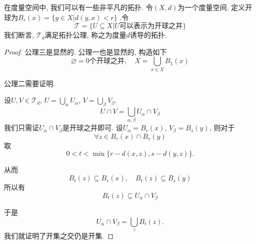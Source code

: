 在度量空间中, 我们可以有一些非平凡的拓扑. 令$\left( X, d \right) $为一个度量空间, 定义开球为$B_{r}\left( x \right)  = \{ y \in X | d\left( y,x \right) < r \}$ .令
\begin{equation}
    \mathscr{T} = \{ U \subseteq X | U \text{可以表示为开球之并} \}
\end{equation}
我们断言, $\mathscr{T}_{d}$满足拓扑公理, 称之为度量$d$诱导的拓扑.
\begin{proof}
    公理三是显然的. 公理一也是显然的, 构造如下
    \begin{equation}
      \varnothing = \text{0个开球之并},\quad X = \bigcup_{x \in X} B_{1}\left( x \right)
    \end{equation}

    公理二需要证明.

    设$U,V \in \mathscr{T}_{d}$, $U = \bigcup_{\alpha} U_{\alpha}$, $V = \bigcup_{\beta} V_{\beta}$. 
    \begin{equation}
        U \cap V = \bigcup_{\alpha, \beta} U_{\alpha} \cap V_{\beta} 
    \end{equation}
    我们只需证$U_{\alpha} \cap V_{\beta}$是开球之并即可. 
    设$U_{\alpha} = B_{r}\left( x \right)$, $V_{\beta} = B_{s}\left( y \right) $, 则对于
    \begin{equation}
      \forall z \in B_{r}\left( x \right) \cap B_{s}\left( y \right) 
    \end{equation}
    取
    \begin{equation}
      0 < t < \min \{ r - d \left( x,z \right) , s - d \left( y, z \right) \}.
    \end{equation}

    从而
    \begin{equation}
      B_{t} \left( z \right) \subseteq B_{r}\left( x \right) , \quad B_{t} \left( z \right) \subseteq B_{s}\left( y \right)
    \end{equation}
    所以有
    \begin{equation}
      B_{t}\left( z \right) \subseteq U_{\alpha} \cap V_{\beta}
    \end{equation}

    于是
    \begin{equation}
      U_{\alpha} \cap V_{\beta} = \bigcup_{z} B_{t} \left( z \right).
    \end{equation}
    我们就证明了开集之交仍是开集.
\end{proof}